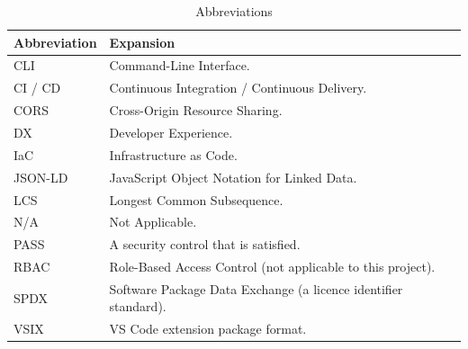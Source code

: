 \begin{longtable}{p{2.6cm}p{11.6cm}}
\caption{Abbreviations}\\
\toprule
\textbf{Abbreviation} & \textbf{Expansion} \\
\midrule

CLI & Command-Line Interface. \\
CI / CD & Continuous Integration / Continuous Delivery. \\
CORS & Cross-Origin Resource Sharing. \\
DX & Developer Experience. \\
IaC & Infrastructure as Code. \\
JSON-LD & JavaScript Object Notation for Linked Data. \\
LCS & Longest Common Subsequence. \\
N/A & Not Applicable. \\
PASS & A security control that is satisfied. \\
RBAC & Role-Based Access Control (not applicable to this project). \\
SPDX & Software Package Data Exchange (a licence identifier standard). \\
VSIX & VS Code extension package format. \\
\bottomrule
\end{longtable}
